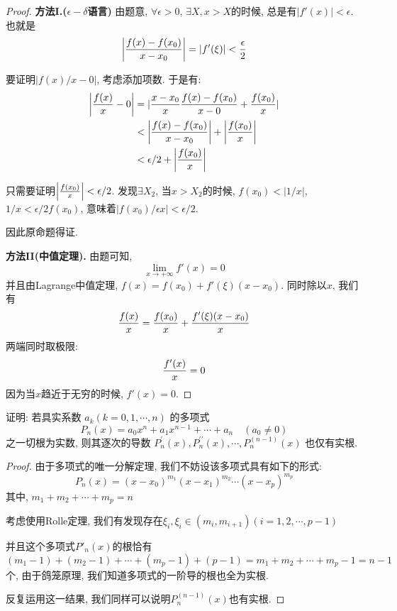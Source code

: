 \begin{proof}
    \textbf{方法I.($\epsilon-\delta$语言)} 由题意, $\forall \epsilon >0$, $\exists X, x>X$的时候, 总是有$|f'(x)|<\epsilon$.
    也就是
    $$
    \left|{f(x)-f(x_0)\over x-x_0}\right|= |f'(\xi)|<{\epsilon \over 2}
    $$

    要证明$|f(x)/x-0|$, 考虑添加项数. 于是有:
    $$
    \begin{aligned}
        \left|{f(x)\over x }-0\right| &= |{x-x_0\over x} {f(x)-f(x_0)\over x-0}+{f(x_0)\over x}|\\ 
        &< \left|{f(x)-f(x_0) \over x-x_0}\right| + \left|f(x_0)\over x\right|\\ 
        &<{\epsilon/2}+\left|f(x_0)\over x\right|
    \end{aligned}
    $$

    只需要证明$\left|f(x_0)\over x\right|<\epsilon/2$.  发现$\exists X_2$, 当$x>X_2$的时候, $f(x_0)< |1/x|$, $1/x< \epsilon/2f(x_0)$, 意味着$|f(x_0)/\epsilon x|<\epsilon /2$. 

    因此原命题得证. 

    \textbf{方法II(中值定理).} 由题可知, 
    $$
    \lim_{x\to +\infty} f'(x)=0
    $$
    并且由Lagrange中值定理, $f(x)=f(x_0)+f'(\xi)(x-x_0)$. 同时除以$x$, 我们有
    $$
    {f(x)\over x}={f(x_0)\over x}+{f'(\xi)(x-x_0)\over x}
    $$
    两端同时取极限: 
    $$
    {f'(x)\over x} = 0
    $$
    因为当$x$趋近于无穷的时候, $f'(x)=0$. 
\end{proof}




\begin{prob} %
    证明: 若具实系数  $a_{k}(k=0,1, \cdots, n)$  的多项式
    $$
    P_{n}(x)=a_{0} x^{n}+a_{1} x^{n-1}+\cdots+a_{n} \quad\left(a_{0} \neq 0\right)
    $$
    之一切根为实数, 则其逐次的导数  $P_{n}^{\prime}(x), P_{n}^{\prime \prime}(x), \cdots, P_{n}^{(n-1)}(x)$  也仅有实根.
\end{prob} 



\begin{proof}
    由于多项式的唯一分解定理, 我们不妨设该多项式具有如下的形式: 
    $$
    P_n(x) = (x-x_0)^{m_1}(x-x_1)^{m_2}\cdots (x-x_p)^{m_p}
    $$
    其中, $m_1+m_2+\cdots+m_p=n$

    考虑使用Rolle定理, 我们有发现存在$\xi_i, \xi_i\in (m_i, m_{i+1})(i=1,2,\cdots , p-1)$

    并且这个多项式$P'_n(x)$的根恰有$(m_1-1)+(m_2-1)+\cdots + (m_p-1)+(p-1)=m_1+m_2+\cdots+m_p-1=n-1$个, 由于鸽笼原理, 我们知道多项式的一阶导的根也全为实根. 

    反复运用这一结果, 我们同样可以说明$P_n^{(n-1)}(x)$也有实根. 

\end{proof}

